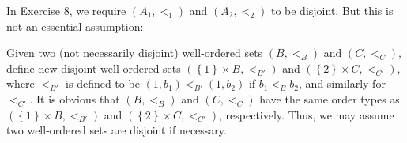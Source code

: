 \documentclass[a4paper,12pt]{article}
\begin{document}
\begin{rem}
	In Exercise 8,
	we require \( (A_1, <_1) \) and \( (A_2, <_2) \) to be disjoint.
	But this is not an essential assumption:
	
	Given two (not necessarily disjoint) well-ordered sets
	\( (B,<_B) \) and \( (C,<_C) \),
	define new disjoint well-ordered sets
	\( (\left\{ 1 \right\}\times B, <_{B'}) \)
	and
	\( (\left\{ 2 \right\}\times C, <_{C'}) \),
	where \( <_{B'} \) is defined to be \( (1,b_1) <_{B'} (1,b_2) \)
	if \( b_1 <_B b_2 \),
	and similarly for \( <_{C'} \).
	It is obvious that \( (B,<_B) \) and \( (C,<_C) \)
	have the same order types as
	\( (\left\{ 1 \right\}\times B, <_{B'}) \)
	and
	\( (\left\{ 2 \right\}\times C, <_{C'}) \),
	respectively.
	Thus, we may assume two well-ordered sets are disjoint if necessary.
\end{rem}
\end{document}
